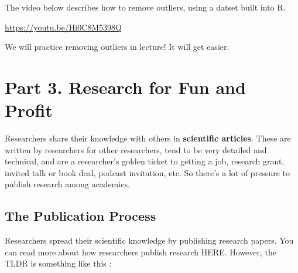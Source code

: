 \documentclass[
  letterpaper,
  DIV=11,
  numbers=noendperiod,
  oneside]{scrreprt}
\begin{document}
The video below describes how to remove outliers, using a datset built
into R.

\url{https://youtu.be/Hi0C8M5398Q}

We will practice removing outliers in lecture! It will get easier.

\chapter{Part 3. Research for Fun and
Profit}\label{part-3.-research-for-fun-and-profit}

Researchers share their knowledge with others in \textbf{scientific
articles}. These are written by researchers for other researchers, tend
to be very detailed and technical, and are a researcher's golden ticket
to getting a job, research grant, invited talk or book deal, podcast
invitation, etc. So there's a lot of pressure to publish research among
academics.

\section{The Publication Process}\label{the-publication-process}

Researchers spread their scientific knowledge by publishing research
papers. You can read more about how researchers publish research HERE.
However, the TLDR is something like this :
\end{document}

